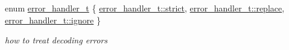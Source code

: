 \begin{DoxyCompactItemize}
\item 
enum \hyperlink{namespacenlohmann_1_1detail_a5a76b60b26dc8c47256a996d18d967df}{error\+\_\+handler\+\_\+t} \{ \hyperlink{namespacenlohmann_1_1detail_a5a76b60b26dc8c47256a996d18d967dfa2133fd717402a7966ee88d06f9e0b792}{error\+\_\+handler\+\_\+t\+::strict}, 
\hyperlink{namespacenlohmann_1_1detail_a5a76b60b26dc8c47256a996d18d967dfa9dde360102c103867bd2f45872f1129c}{error\+\_\+handler\+\_\+t\+::replace}, 
\hyperlink{namespacenlohmann_1_1detail_a5a76b60b26dc8c47256a996d18d967dfa567bc1d268f135496de3d5b946b691f3}{error\+\_\+handler\+\_\+t\+::ignore}
 \}\begin{DoxyCompactList}\small\item\em how to treat decoding errors \end{DoxyCompactList}
\end{DoxyCompactItemize}
